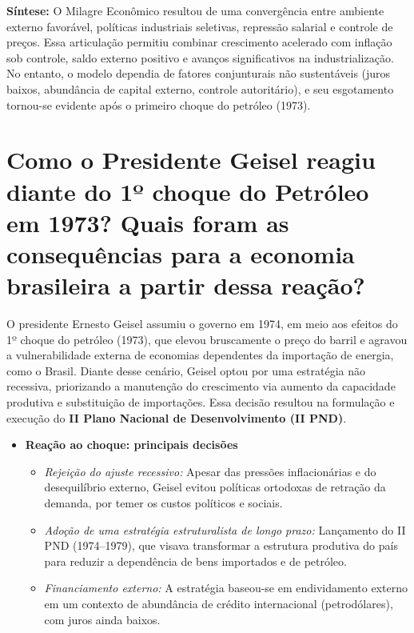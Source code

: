 \documentclass{sciposter}
\begin{document}
\begin{multicols}{3}
\textbf{Síntese:} O Milagre Econômico resultou de uma convergência entre ambiente externo favorável, políticas industriais seletivas, repressão salarial e controle de preços. Essa articulação permitiu combinar crescimento acelerado com inflação sob controle, saldo externo positivo e avanços significativos na industrialização. No entanto, o modelo dependia de fatores conjunturais não sustentáveis (juros baixos, abundância de capital externo, controle autoritário), e seu esgotamento tornou-se evidente após o primeiro choque do petróleo (1973).

\section{\textbf{Como o Presidente Geisel reagiu diante do 1º choque do Petróleo em 1973? Quais foram as consequências para a economia brasileira a partir dessa reação?}}

O presidente Ernesto Geisel assumiu o governo em 1974, em meio aos efeitos do 1º choque do petróleo (1973), que elevou bruscamente o preço do barril e agravou a vulnerabilidade externa de economias dependentes da importação de energia, como o Brasil. Diante desse cenário, Geisel optou por uma estratégia não recessiva, priorizando a manutenção do crescimento via aumento da capacidade produtiva e substituição de importações. Essa decisão resultou na formulação e execução do \textbf{II Plano Nacional de Desenvolvimento (II PND)}.

\begin{itemize}
    \item \textbf{Reação ao choque: principais decisões}
    \begin{itemize}
        \item \textit{Rejeição do ajuste recessivo:} Apesar das pressões inflacionárias e do desequilíbrio externo, Geisel evitou políticas ortodoxas de retração da demanda, por temer os custos políticos e sociais.
        \item \textit{Adoção de uma estratégia estruturalista de longo prazo:} Lançamento do II PND (1974--1979), que visava transformar a estrutura produtiva do país para reduzir a dependência de bens importados e de petróleo.
        \item \textit{Financiamento externo:} A estratégia baseou-se em endividamento externo em um contexto de abundância de crédito internacional (petrodólares), com juros ainda baixos.
    \end{itemize}


\end{itemize}
\end{multicols}
\end{document}

